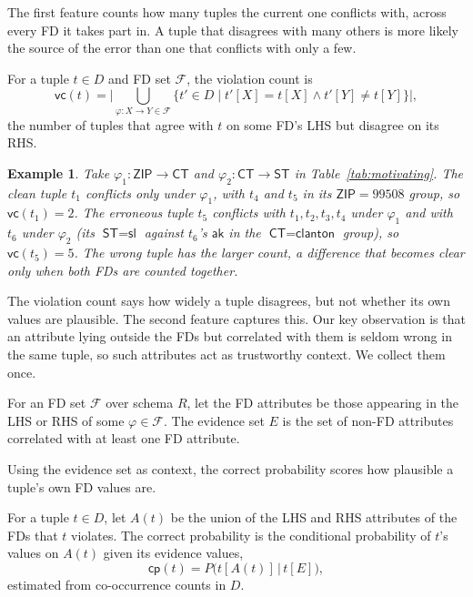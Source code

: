 \documentclass[sigconf]{acmart}
\newtheorem{example}{Example}
\begin{document}
The first feature counts how many tuples the current one conflicts with, across every FD it takes part in.
A tuple that disagrees with many others is more likely the source of the error than one that conflicts with only a few.

\begin{definition}
For a tuple $t \in D$ and FD set $\mathcal{F}$, the violation count is
\begin{equation}
\textsf{vc}(t) =
\Big| \bigcup_{\varphi: X \rightarrow Y \in \mathcal{F}}
\{ t' \in D \mid t'[X] = t[X] \land t'[Y] \neq t[Y] \} \Big|,
\end{equation}
the number of tuples that agree with $t$ on some FD's LHS but disagree on its RHS.
\end{definition}

\begin{example}
Take $\varphi_1: \textsf{ZIP} \rightarrow \textsf{CT}$ and $\varphi_2: \textsf{CT} \rightarrow \textsf{ST}$ in Table~\ref{tab:motivating}. The clean tuple $t_1$ conflicts only under $\varphi_1$, with $t_4$ and $t_5$ in its $\textsf{ZIP}=99508$ group, so $\textsf{vc}(t_1)=2$. The erroneous tuple $t_5$ conflicts with $t_1, t_2, t_3, t_4$ under $\varphi_1$ and with $t_6$ under $\varphi_2$ (its $\textsf{ST}=\textsf{sl}$ against $t_6$'s $\textsf{ak}$ in the $\textsf{CT}=\textsf{clanton}$ group), so $\textsf{vc}(t_5)=5$. The wrong tuple has the larger count, a difference that becomes clear only when both FDs are counted together.
\end{example}

The violation count says how widely a tuple disagrees, but not whether its own values are plausible. The second feature captures this. Our key observation is that an attribute lying outside the FDs but correlated with them is seldom wrong in the same tuple, so such attributes act as trustworthy context. We collect them once.

\begin{definition}
For an FD set $\mathcal{F}$ over schema $R$, let the FD attributes be those appearing in the LHS or RHS of some $\varphi \in \mathcal{F}$. The evidence set $E$ is the set of non-FD attributes correlated with at least one FD attribute.
\end{definition}

Using the evidence set as context, the correct probability scores how plausible a tuple's own FD values are.

\begin{definition}
For a tuple $t \in D$, let $A(t)$ be the union of the LHS and RHS attributes of the FDs that $t$ violates. The correct probability is the conditional probability of $t$'s values on $A(t)$ given its evidence values,
\begin{equation}
\textsf{cp}(t) = P\big(t[A(t)] \,\big|\, t[E]\big),
\end{equation}
estimated from co-occurrence counts in $D$.
\end{definition}
\end{document}
